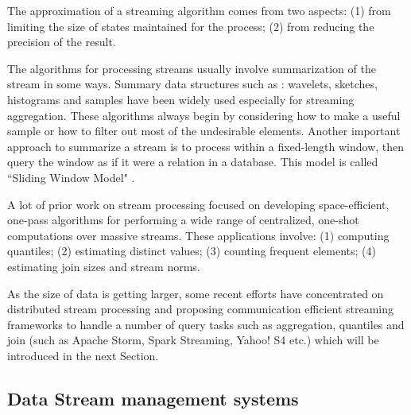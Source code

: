 \documentclass[	DIV=calc,%
							paper=a4,%
							fontsize=11pt,%
							twocolumn]{scrartcl}	 					%
\begin{document}
The approximation of a streaming algorithm comes from two aspects: (1) from limiting the size of states maintained for the process; (2) from reducing the precision of the result. 

The algorithms for processing streams usually involve summarization of the stream in some ways. Summary data structures such as : wavelets, sketches, histograms and samples have been widely used especially  for streaming aggregation. These algorithms always begin by considering how to make a useful sample or how to filter out most of the undesirable elements. Another important approach to summarize a stream is to process within a fixed-length window, then query the window as if it were a relation in a database. This model is called ``Sliding Window Model" \cite{SlidingWindow}.


A lot of prior work on stream processing focused on developing space-efficient, one-pass algorithms for performing a wide range of centralized, one-shot computations over massive streams. These applications involve: (1) computing quantiles; (2) estimating distinct values; (3) counting frequent elements; (4) estimating join sizes and stream norms.

As the size of data is getting larger, some recent efforts have concentrated on distributed stream processing and proposing communication efficient streaming frameworks to handle a number of query tasks such as aggregation, quantiles and join (such as Apache Storm, Spark Streaming, Yahoo! S4 etc.) which will be introduced in the next Section.  


\subsection*{Data Stream management systems}
\end{document}
